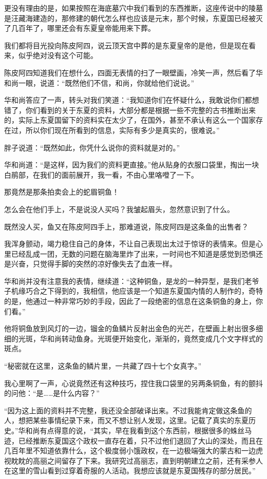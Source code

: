 更没有理由的是，如果按照在海底墓穴中我们看到的东西推断，这座传说中的陵墓是汪藏海建造的，那修建的朝代怎么样也应该是元末，那个时候，东夏国已经被灭了几百年了，哪里还会有东夏皇帝能用来下葬。

我们都将目光投向陈皮阿四，说云顶天宫中葬的是东夏皇帝的是他，但是现在看来，似乎绝对没有这个可能。

陈皮阿四知道我们在想什么，四面无表情的扫了一眼壁画，冷笑一声，然后看了华和尚一眼，说道：“既然他们不信，和尚，你就给他们说说。”

华和尚答应了一声，转头对我们笑道：“我知道你们在怀疑什么，我敢说你们都想错了，你们看到的关于东夏的资料，大部分都是根据一些不完整的古书推断出来的，实际上东夏国留下的资料实在太少了，在国外，甚至不承认有这么一个国家存在过，所以你们现在所看到的信息，实际有多少是真实的，很难说。”

胖子说道：“既然如此，你凭什么说你的资料就是对的。”

华和尚道：“是这样，因为我们的资料更直接。”他从贴身的衣服口袋里，掏出一块白鹃部，在我们的面前展开，我一看，不由心里咯噔了一下。

那竟然是那条拍卖会上的蛇眉铜鱼！

怎么会在他们手上，不是说没人买吗？我皱起眉头，忽然意识到了什么。

既然没人买，鱼又在陈皮阿四手上，那难道说，陈皮阿四是这条鱼的出售者？

我浑身颤动，竭力稳住自己的身体，不让自己表现出太过于惊讶的表情来。但是心里已经乱成一团，无数的问题在脑海里炸了出来，一时间也不知道是感觉到恐惧还是兴奋，只觉得手脚的突然的凉好像失去了血液一样。

华和尚并没有注意我的表情，继续道：“这种铜鱼，是龙的一种异型，是我们老爷子机缘巧合之下得到的，我相信，他应该是一个知道东夏国内情的人制作的，奇特的是，他通过一种非常巧妙的手段，因此了一段绝密的信息在这条铜鱼的身上，你们看。”

他将铜鱼放到风灯的一边，镏金的鱼鳞片反射出金色的光芒，在壁画上射出很多细细的光斑，华和尚转动鱼身。光斑便开始变化，渐渐的，竟然变成几个文字样式的斑点。

“秘密就在这里，这条鱼的鳞片里，一共藏了四十七个女真字。”

我心里啊了一声，心说竟然还有这种技巧，捏住我口袋里的另两条铜鱼，有的颤抖的问他：“是……是什么内容？”

“因为这上面的资料并不完整，我还没全部破译出来。不过我能肯定做这条鱼的人，想把某些事情纪录下来，而又不想让别人发现，这里。记载了真实的东夏历史。”华和尚有点得意的说，“其实，早在我看到这个东西前，根据很多的蛛丝马迹，已经推断东夏国这个政权一直存在着，只不过他们退回了大山的深处，而且在几百年里不知道依靠什么，这个极度弱小饿政权，在一边极端强大的蒙古和一边虎视眈眈的高丽之间留存了下来。我研究过高丽志，直到明朝建立之前，还有采参人在这里的雪山看到过穿着奇服的人活动。我想应该就是东夏国残存的部分居民。”

